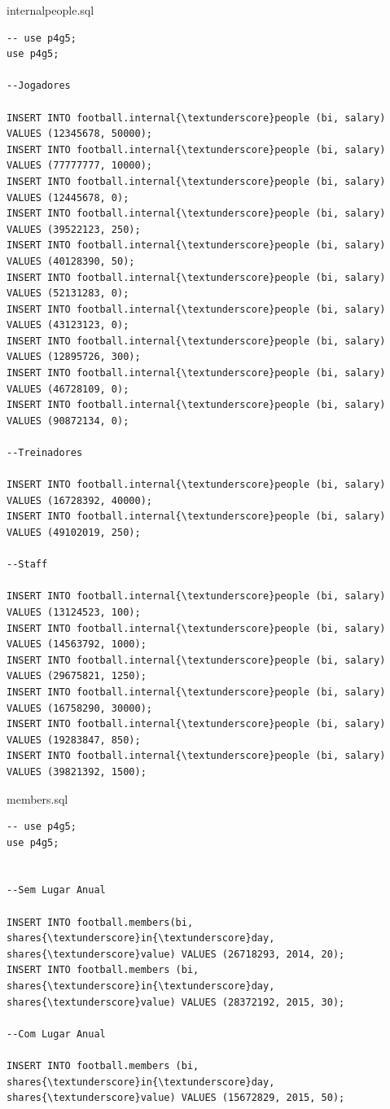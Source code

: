 \documentclass[pdftex,12pt,a4paper]{report}
\begin{document}
internal{\textunderscore}people.sql
\begin{lstlisting} 
-- use p4g5;
use p4g5;

--Jogadores

INSERT INTO football.internal{\textunderscore}people (bi, salary) VALUES (12345678, 50000);
INSERT INTO football.internal{\textunderscore}people (bi, salary) VALUES (77777777, 10000);
INSERT INTO football.internal{\textunderscore}people (bi, salary) VALUES (12445678, 0);
INSERT INTO football.internal{\textunderscore}people (bi, salary) VALUES (39522123, 250);
INSERT INTO football.internal{\textunderscore}people (bi, salary) VALUES (40128390, 50);
INSERT INTO football.internal{\textunderscore}people (bi, salary) VALUES (52131283, 0);
INSERT INTO football.internal{\textunderscore}people (bi, salary) VALUES (43123123, 0);
INSERT INTO football.internal{\textunderscore}people (bi, salary) VALUES (12895726, 300);
INSERT INTO football.internal{\textunderscore}people (bi, salary) VALUES (46728109, 0);
INSERT INTO football.internal{\textunderscore}people (bi, salary) VALUES (90872134, 0);

--Treinadores

INSERT INTO football.internal{\textunderscore}people (bi, salary) VALUES (16728392, 40000);
INSERT INTO football.internal{\textunderscore}people (bi, salary) VALUES (49102019, 250);

--Staff

INSERT INTO football.internal{\textunderscore}people (bi, salary) VALUES (13124523, 100);
INSERT INTO football.internal{\textunderscore}people (bi, salary) VALUES (14563792, 1000);
INSERT INTO football.internal{\textunderscore}people (bi, salary) VALUES (29675821, 1250);
INSERT INTO football.internal{\textunderscore}people (bi, salary) VALUES (16758290, 30000);
INSERT INTO football.internal{\textunderscore}people (bi, salary) VALUES (19283847, 850);
INSERT INTO football.internal{\textunderscore}people (bi, salary) VALUES (39821392, 1500);

\end{lstlisting}

members.sql
\begin{lstlisting} 
-- use p4g5;
use p4g5;


--Sem Lugar Anual

INSERT INTO football.members(bi, shares{\textunderscore}in{\textunderscore}day, shares{\textunderscore}value) VALUES (26718293, 2014, 20);
INSERT INTO football.members (bi, shares{\textunderscore}in{\textunderscore}day, shares{\textunderscore}value) VALUES (28372192, 2015, 30);

--Com Lugar Anual

INSERT INTO football.members (bi, shares{\textunderscore}in{\textunderscore}day, shares{\textunderscore}value) VALUES (15672829, 2015, 50);

\end{lstlisting}
\end{document}
